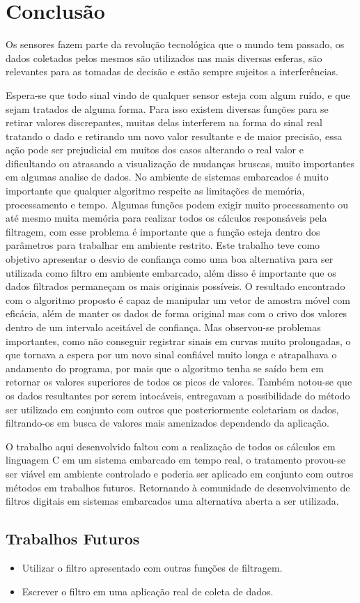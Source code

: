
\chapter{Conclusão}\label{cap:conclusao}

Os sensores fazem parte da revolução tecnológica que o mundo tem passado, os dados coletados pelos mesmos são utilizados nas mais diversas esferas, são relevantes para as tomadas de decisão e estão sempre sujeitos a interferências.
 
Espera-se que todo sinal vindo de qualquer sensor esteja com algum ruído, e que sejam tratados de alguma forma. Para isso existem diversas funções para se retirar valores discrepantes, muitas delas interferem na forma do sinal real tratando o dado e retirando um novo valor resultante e de maior precisão, essa ação pode ser prejudicial em muitos dos casos alterando o real valor e dificultando ou atrasando a visualização de mudanças bruscas, muito importantes em algumas analise de dados. No ambiente de sistemas embarcados é muito importante que qualquer algoritmo respeite as limitações de memória, processamento e tempo. Algumas funções podem exigir muito processamento ou até mesmo muita memória para realizar todos os cálculos responsáveis pela filtragem, com esse problema é importante que a função esteja dentro dos parâmetros para trabalhar em ambiente restrito.
Este trabalho teve como objetivo apresentar o desvio de confiança como uma boa alternativa para ser utilizada como filtro em ambiente embarcado, além disso é importante que os dados filtrados permaneçam os mais originais possíveis. 
O resultado encontrado com o algoritmo proposto é capaz de manipular um vetor de amostra móvel com eficácia, além de manter os dados de forma original mas com o crivo dos valores dentro de um intervalo aceitável de confiança. Mas observou-se problemas importantes, como não conseguir registrar sinais em curvas muito prolongadas, o que tornava a espera por um novo sinal confiável muito longa e atrapalhava o andamento do programa, por mais que o algoritmo tenha se saído bem em retornar os valores superiores de todos os picos de valores. Também notou-se que os dados resultantes por serem intocáveis, entregavam a possibilidade do método ser utilizado em conjunto com outros que posteriormente coletariam os dados, filtrando-os em busca de valores mais amenizados dependendo da aplicação.
 
O trabalho aqui desenvolvido faltou com a realização de todos os cálculos em linguagem C em um sistema embarcado em tempo real, o tratamento provou-se ser viável em ambiente controlado e poderia ser aplicado em conjunto com outros métodos em trabalhos futuros. Retornando à comunidade de desenvolvimento de filtros digitais em sistemas embarcados uma alternativa aberta a ser utilizada.


\section{Trabalhos Futuros}

\begin{itemize}
    \item Utilizar o filtro apresentado com outras funções de filtragem.
    \item Escrever o filtro em uma aplicação real de coleta de dados.
  \end{itemize}
